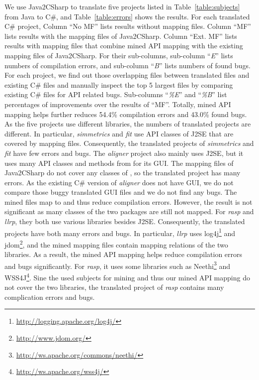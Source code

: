 We use Java2CSharp to translate five projects listed in
Table~\ref{table:subjects} from Java to C\#, and
Table~\ref{table:errors} shows the results. For each translated C\#
project, Column ``No MF'' lists results without mapping files.
Column ``MF'' lists results with the mapping files of Java2CSharp.
Column ``Ext. MF'' lists results with mapping files that combine
mined API mapping with the existing mapping files of Java2CSharp.
For their sub-columns, sub-column ``\emph{E}'' lists numbers of
compilation errors, and sub-column ``\emph{B}'' lists numbers of
found bugs. For each project, we find out those overlapping files
between translated files and existing C\# files and manually inspect
the top 5 largest files by comparing existing C\# files for API
related bugs. Sub-columns ``\emph{\%E}'' and ``\emph{\%B}'' list
percentages of improvements over the results of ``MF''. Totally,
mined API mapping helps further reduces 54.4\% compilation errors
and 43.0\% found bugs. As the five projects use different libraries,
the numbers of translated projects are different. In particular,
\emph{simmetrics} and \emph{fit} use API classes of J2SE that are
covered by mapping files. Consequently, the translated projects of
\emph{simmetrics} and \emph{fit} have few errors and bugs. The
\emph{aligner} project also mainly uses J2SE, but it uses many API
classes and methods from  for its GUI. The mapping
files of Java2CSharp do not cover any classes of ,
so the translated project has many errors. As the existing C\#
version of \emph{aligner} does not have GUI, we do not compare those
buggy translated GUI files and we do not find any bugs. The mined
files map  to  and
thus reduce compilation errors. However, the result is not
significant as many classes of the two packages are still not
mapped. For \emph{rasp} and \emph{llrp}, they both use various
libraries besides J2SE. Consequently, the translated projects have
both many errors and bugs. In particular, \emph{llrp} uses
log4j\footnote{\url{http://logging.apache.org/log4j/}} and
jdom\footnote{\url{http://www.jdom.org/}}, and the mined mapping
files contain mapping relations of the two libraries. As a result,
the mined API mapping helps reduce compilation errors and bugs
significantly. For \emph{rasp}, it uses some libraries such as
Neethi\footnote{\url{http://ws.apache.org/commons/neethi/}} and
WSS4J\footnote{\url{http://ws.apache.org/wss4j/}}. Sine the used
subjects for mining and thus our mined API mapping do not cover the
two libraries, the translated project of \emph{rasp} contains many
complication errors and bugs.


